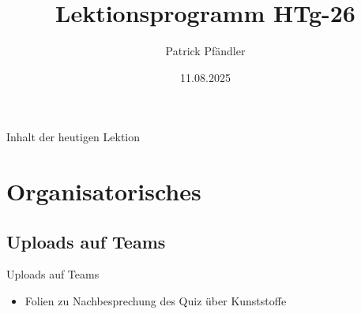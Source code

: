 



\title{\textbf{Lektionsprogramm HTg-26}}
\author{Patrick Pfändler}
\date{11.08.2025}




\frame{\titlepage}





\begin{frame}{Inhalt der heutigen Lektion}
    \tableofcontents
\end{frame}


\section{Organisatorisches}
\BlueSectionSlide

\subsection{Uploads auf Teams}
\begin{frame}{Uploads auf Teams}
    \begin{itemize}
        \item[\textbullet] Folien zu Nachbesprechung des Quiz über Kunststoffe
    \end{itemize}

\end{frame}


